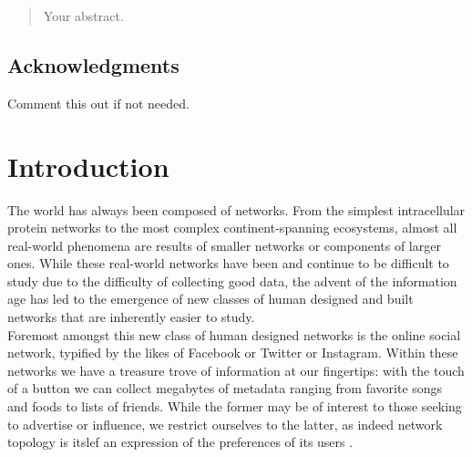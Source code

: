 \documentclass[12pt,twoside]{report}
\date{September 2019}
\begin{document}



\clearpage{\pagestyle{empty}\cleardoublepage}
\setcounter{page}{1}
\pagestyle{fancy}

\begin{abstract}
Your abstract.
\end{abstract}

\cleardoublepage
\section*{Acknowledgments}
Comment this out if not needed.

\clearpage{\pagestyle{empty}\cleardoublepage}

\tableofcontents 


\clearpage{\pagestyle{empty}\cleardoublepage}
\setcounter{page}{1}
\fancyhead[LE,RO]{\slshape \rightmark}
\fancyhead[LO,RE]{\slshape \leftmark}

\chapter{Introduction}

The world has always been composed of networks. From the simplest intracellular protein networks to the most complex continent-spanning ecosystems, almost all real-world phenomena are results of smaller networks or components of larger ones. While these real-world networks have been and continue to be difficult to study due to the difficulty of collecting good data, the advent of the information age has led to the emergence of new classes of human designed and built networks that are inherently easier to study. \\

Foremost amongst this new class of human designed networks is the online social network, typified by the likes of Facebook or Twitter or Instagram. Within these networks we have a treasure trove of information at our fingertips: with the touch of a button we can collect megabytes of metadata ranging from favorite songs and foods to lists of friends. While the former may be of interest to those seeking to advertise or influence, we restrict ourselves to the latter, as indeed network topology is itslef an expression of the preferences of its users \cite{centola2015social}.\\
\end{document}
